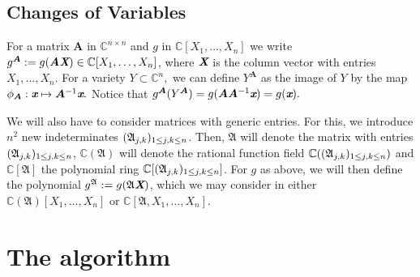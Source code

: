 \documentclass[a4paper]{article}
\def\A{\mathfrak{A}}
\def\Xb{\textit{\textbf{X}}}
\def\mA{{\bm A}}
\def\xb{\textit{\textbf{x}}}
\def\C{\mathbb{C}}
\begin{document}
\subsection{Changes of Variables}
For a matrix $\mA$ in $\C^{n\times n}$ and $g$ in
$\C[X_1,\hdots,X_n]$ we write $g^\mA:=g(\mA \Xb) \in
\C[X_1,\dots,X_n]$, where $\Xb$ is the column vector with entries
$X_1,\dots,X_n$. For a variety $Y \subset \C^n,$ we can define $Y^{\mA}$ as the image of $Y$ by the map $\phi_{\mA} : \xb \mapsto \mA^{-1}\xb.$ Notice that $g^{\mA}(Y^{\mA}) = g(\mA \mA^{-1}\xb)=g(\xb).$ 

We will also have to consider matrices with generic entries. For this,
we introduce $n^2$ new indeterminates $(\frak A_{j,k})_{1\le j,k \le
  n}$. Then, $\A$ will denote the matrix with entries $(\frak
A_{j,k})_{1\le j,k \le n}$, $\C(\A)$ will denote the rational function
field $\C((\frak A_{j,k})_{1\le j,k \le n})$ and $\C[\A]$ the
polynomial ring $\C[(\frak A_{j,k})_{1\le j,k \le n}]$.  For $g$ as
above, we will then define the polynomial $g^\A:=g(\A \Xb)$, 
which we may consider in either
$\C(\A)[X_1,\dots,X_n]$ or $\C[\A,X_1,\dots,X_n]$.



\section{The algorithm}
\end{document}
